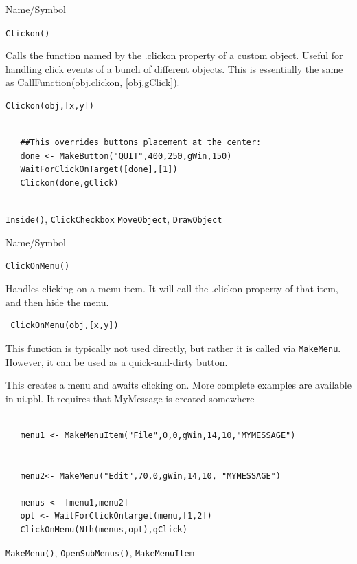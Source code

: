 \begin{desc}{Name/Symbol}
\item[Name/Symbol]	\verb+Clickon()+

\item[Description] Calls the function named by the  .clickon property of a custom object.  Useful for handling click events of a bunch of different objects. This is essentially the same as CallFunction(obj.clickon, [obj,gClick]).

\item[Usage]
\begin{verbatim}
Clickon(obj,[x,y])	
\end{verbatim}

\item[Example]	


\begin{verbatim}
  
   ##This overrides buttons placement at the center:  
   done <- MakeButton("QUIT",400,250,gWin,150)
   WaitForClickOnTarget([done],[1])
   Clickon(done,gClick)
    
\end{verbatim}

\item[See Also]	
\verb+Inside()+, \verb+ClickCheckbox+ \verb+MoveObject+, \verb+DrawObject+
\end{desc}


\begin{desc}{Name/Symbol}
\item[Name/Symbol]  	\verb+ClickOnMenu()+

\item[Description]	
Handles clicking on a menu item. It will call the .clickon property of that item, and then hide the menu.

\item[Usage]
\begin{verbatim}
 ClickOnMenu(obj,[x,y])
  \end{verbatim}
This function is typically not used directly, but rather it is called via \texttt{MakeMenu}. However, it can be used as a quick-and-dirty button.

\item[Example]      	
This creates a menu and awaits clicking on.  More complete examples are available in ui.pbl.  It requires that MyMessage is created somewhere
\begin{verbatim}

   menu1 <- MakeMenuItem("File",0,0,gWin,14,10,"MYMESSAGE")


   menu2<- MakeMenu("Edit",70,0,gWin,14,10, "MYMESSAGE")
   
   menus <- [menu1,menu2]
   opt <- WaitForClickOntarget(menu,[1,2])
   ClickOnMenu(Nth(menus,opt),gClick)
\end{verbatim}

\item[See Also]	\verb+MakeMenu()+, \verb+OpenSubMenus()+, \verb+MakeMenuItem+
\end{desc}


